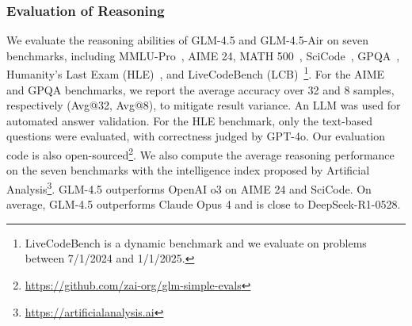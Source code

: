 \noindent\begin{minipage}{\textwidth}
\label{fig:tau-prompt}
\end{minipage}

\subsubsection{Evaluation of Reasoning}

We evaluate the reasoning abilities of GLM-4.5 and GLM-4.5-Air on seven benchmarks, including MMLU-Pro~\cite{wang2024mmlu}, AIME 24, MATH 500~\cite{hendrycks2measuring}, SciCode~\cite{tian2024scicode}, GPQA~\cite{rein2024gpqa}, Humanity's Last Exam (HLE)~\cite{phan2025humanity}, and LiveCodeBench (LCB)~\cite{jainlivecodebench}\footnote{LiveCodeBench is a dynamic benchmark and we evaluate on problems between 7/1/2024 and 1/1/2025.}. For the AIME and GPQA benchmarks, we report the average accuracy over 32 and 8 samples, respectively (Avg@32, Avg@8), to mitigate result variance. An LLM was used for automated answer validation. For the HLE benchmark, only the text-based questions were evaluated, with correctness judged by GPT-4o. Our evaluation code is also open-sourced\footnote{\url{https://github.com/zai-org/glm-simple-evals}}. We also compute the average reasoning performance on the seven benchmarks with the intelligence index proposed by Artificial Analysis\footnote{\url{https://artificialanalysis.ai}}. GLM-4.5 outperforms OpenAI o3 on AIME 24 and SciCode. On average, GLM-4.5 outperforms Claude Opus 4 and is close to DeepSeek-R1-0528.

